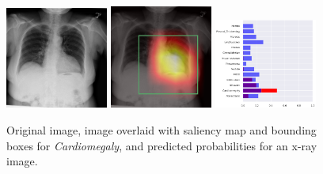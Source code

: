 \documentclass[12pt,oneside,a4paper]{report}
\begin{document}
\begin{figure}[H]
  \centering
  \includegraphics[width=0.3\textwidth]{images/preds/cardiomegaly}\hspace{0.01\textwidth}%
  \includegraphics[width=0.3\textwidth]{images/preds/cardiomegaly_cam}\hspace{0.01\textwidth}%
  \includegraphics[width=0.3\textwidth]{images/preds/cardiomegaly_probs}\\[0.01\textwidth]
  \caption{Original image, image overlaid with saliency map and bounding boxes
    for \emph{Cardiomegaly}, and predicted probabilities for an x-ray image.}
  \label{examples_2}
\end{figure}
\end{document}
